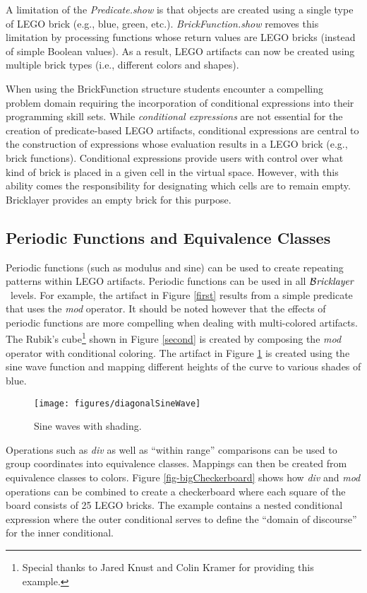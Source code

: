 \documentclass[submission,copyright,creativecommons]{eptcs}
\newcommand{\bricklayer}{\ensuremath{\mathcal{B}\emph{ricklayer}}}
\begin{document}
A limitation of the \emph{Predicate.show} is that objects are created using a single type of LEGO brick (e.g., blue, green, etc.). \emph{BrickFunction.show} removes this limitation by processing functions whose return values are LEGO bricks (instead of simple Boolean values). As a result, LEGO artifacts can now be created using multiple brick types (i.e., different colors and shapes).

When using the BrickFunction structure students encounter a compelling problem domain requiring the incorporation of conditional expressions into their programming skill sets.
While \emph{conditional expressions} are not essential for the creation of predicate-based LEGO artifacts, conditional expressions are central to the construction of expressions whose evaluation results in a LEGO brick (e.g., brick functions). Conditional expressions provide users with control over what kind of brick is placed in a given cell in the virtual space. However, with this ability comes the responsibility for designating which cells are to remain empty. Bricklayer provides an empty brick for this purpose.


\subsection{Periodic Functions and Equivalence Classes}
Periodic functions (such as modulus and sine) can be used to create repeating patterns within LEGO artifacts. Periodic functions can be used in all \bricklayer\ levels. For example, the artifact in Figure \ref{first} results from a simple predicate that uses the \emph{mod} operator. It should be noted however that the effects of periodic functions are more compelling when dealing with multi-colored artifacts. The Rubik's cube\footnote{Special thanks to Jared Knust and Colin Kramer for providing this example.} shown in Figure \ref{second} is created by composing the \emph{mod} operator with conditional coloring. The artifact in Figure \ref{fig-diagonalSineWaves} is created using the sine wave function and mapping different heights of the curve to various shades of blue.


\begin{figure}[htb!]
\centering
\texttt{[image: figures/diagonalSineWave]}
\caption{Sine waves with shading.}\label{fig-diagonalSineWaves}
\end{figure}


Operations such as \emph{div} as well as ``within range'' comparisons can be used to group coordinates into equivalence classes. Mappings can then be created from equivalence classes to colors. Figure \ref{fig-bigCheckerboard} shows how \emph{div} and \emph{mod} operations can be combined to create a checkerboard where each square of the board consists of 25 LEGO bricks. The example contains a nested conditional expression where the outer conditional serves to define the ``domain of discourse'' for the inner conditional.
\end{document}
